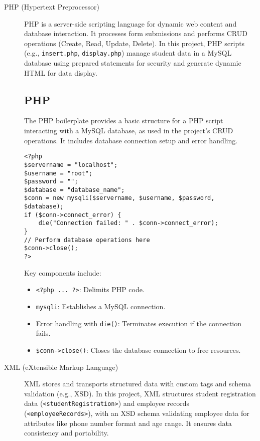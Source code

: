 \begin{description}
    \item[PHP (Hypertext Preprocessor)] PHP is a server-side scripting language for dynamic web content and database interaction. It processes form submissions and performs CRUD operations (Create, Read, Update, Delete). In this project, PHP scripts (e.g., \texttt{insert.php}, \texttt{display.php}) manage student data in a MySQL database using prepared statements for security and generate dynamic HTML for data display.

    \subsection{PHP }
    The PHP boilerplate provides a basic structure for a PHP script interacting with a MySQL database, as used in the project’s CRUD operations. It includes database connection setup and error handling.
    \lstset{language=PHP}
    \begin{lstlisting}
<?php
$servername = "localhost";
$username = "root";
$password = "";
$database = "database_name";
$conn = new mysqli($servername, $username, $password, $database);
if ($conn->connect_error) {
    die("Connection failed: " . $conn->connect_error);
}
// Perform database operations here
$conn->close();
?>
    \end{lstlisting}
    Key components include:
    \begin{itemize}
        \item \texttt{<?php ... ?>}: Delimits PHP code.
        \item \texttt{mysqli}: Establishes a MySQL connection.
        \item Error handling with \texttt{die()}: Terminates execution if the connection fails.
        \item \texttt{\$conn->close()}: Closes the database connection to free resources.
    \end{itemize}

    \item[XML (eXtensible Markup Language)] XML stores and transports structured data with custom tags and schema validation (e.g., XSD). In this project, XML structures student registration data (\texttt{<studentRegistration>}) and employee records (\texttt{<employeeRecords>}), with an XSD schema validating employee data for attributes like phone number format and age range. It ensures data consistency and portability.


\end{description}

